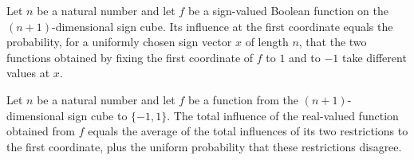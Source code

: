 \begin{theorem}
\label{FABL.booleanInfluence_zero}
\leanok
{}
Let $n$ be a natural number and let $f$ be a sign-valued Boolean function on the
$(n+1)$-dimensional sign cube. Its influence at the first coordinate equals the
probability, for a uniformly chosen sign vector $x$ of length $n$, that the two
functions obtained by fixing the first coordinate of $f$ to $1$ and to $-1$ take
different values at $x$.
\end{theorem}

\begin{theorem}
\label{FABL.totalInfluence_cons}
\leanok
{}
Let $n$ be a natural number and let $f$ be a function from the $(n+1)$-dimensional sign
cube to $\{ -1,1 \}$. The total influence of the real-valued function obtained from
$f$ equals the average of the total influences of its two restrictions to the first
coordinate, plus the uniform probability that these restrictions disagree.
\end{theorem}

